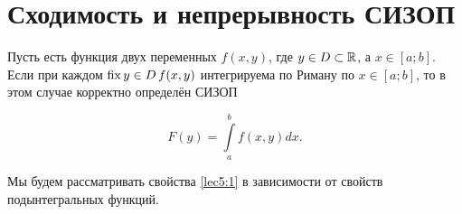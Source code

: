 \documentclass[../../main.tex]{subfiles}
\begin{document}
    \section{Сходимость и непрерывность СИЗОП}
    
    Пусть есть функция двух переменных $f(x,y)$, где $y \in D \subset \mathbb{R}$, 
    а $x \in [a;b]$. Если при каждом $\operatorname{fix} y \in D \, f(x, y)$ интегрируема 
    по Риману по $x \in [a;b]$, то в этом случае корректно определён СИЗОП
    
    \begin{equation} \label{lec5:1}
        F(y) = \int\limits_a^b f(x, y)dx.
    \end{equation}

    Мы будем рассматривать свойства \eqref{lec5:1} в зависимости от свойств 
    подынтегральных функций.
\end{document}
